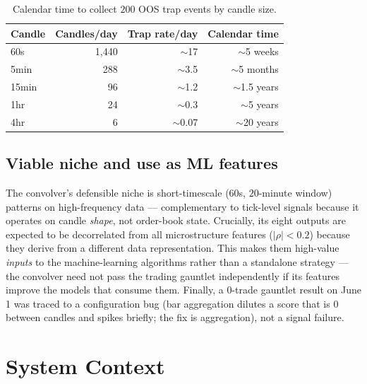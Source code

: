 \documentclass[11pt]{article}
\newcommand{\toprule}{\hline}
\newcommand{\midrule}{\hline}
\newcommand{\bottomrule}{\hline}
\newcommand{\code}[1]{\texttt{\detokenize{#1}}}
\begin{document}
\begin{table}[h]
\centering\footnotesize
\caption{Calendar time to collect $200$ OOS trap events by candle size.}
\label{tab:scaling}
\begin{tabular}{lrrr}
\toprule
Candle & Candles/day & Trap rate/day & Calendar time \\
\midrule
60s   & 1{,}440 & $\sim$17   & $\sim$5 weeks \\
5min  & 288     & $\sim$3.5  & $\sim$5 months \\
15min & 96      & $\sim$1.2  & $\sim$1.5 years \\
1hr   & 24      & $\sim$0.3  & $\sim$5 years \\
4hr   & 6       & $\sim$0.07 & $\sim$20 years \\
\bottomrule
\end{tabular}
\end{table}

\subsection{Viable niche and use as ML features}
The convolver's defensible niche is short-timescale ($60$s, $20$-minute window) patterns on
high-frequency data --- complementary to tick-level signals because it operates on candle
\emph{shape}, not order-book state. Crucially, its eight \code{alg_conv_*} outputs are
expected to be decorrelated from all microstructure features ($|\rho| < 0.2$) because they
derive from a different data representation. This makes them high-value \emph{inputs} to the
machine-learning algorithms rather than a standalone strategy --- the convolver need not
pass the trading gauntlet independently if its features improve the models that consume
them. Finally, a $0$-trade gauntlet result on June 1 was traced to a configuration bug
(bar aggregation \code{mean} dilutes a score that is $0$ between candles and spikes briefly;
the fix is \code{max} aggregation), not a signal failure.

\section{System Context}\label{sec:context}
\end{document}

